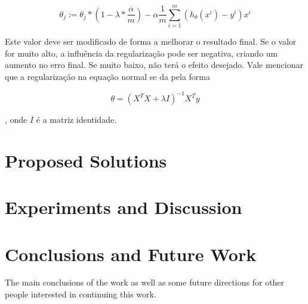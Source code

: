 \documentclass[conference]{IEEEtran}
\begin{document}
\begin{equation} \label{eq:regularization}
\theta_{j} := \theta_{j} * (1 - \lambda * \dfrac{\alpha}{m}) - \alpha \dfrac{1}{m} \sum_{i=1}^{m}(h_{\theta}(x^{i}) - y^{i}) x^{i}
\end{equation}

Este valor deve ser modificado de forma a melhorar o resultado final. Se o valor for muito alto, a influência da regularização pode ser negativa, criando um aumento no erro final. Se muito baixo, não terá o efeito desejado. Vale mencionar que a regularização na equação normal se da pela forma

\begin{equation} \label{eq:normal_reg}
\theta = (X^{T}X + \lambda I)^{-1}X^{T}y
\end{equation}

, onde $I$ é a matriz identidade.

\section{Proposed Solutions}



\section{Experiments and Discussion}

\begin{figure}[h]
	\centering
\end{figure}



\section{Conclusions and Future Work}

The main conclusions of the work as well as some future directions for other people interested in continuing this work. ~\cite{b1}



\end{document}
